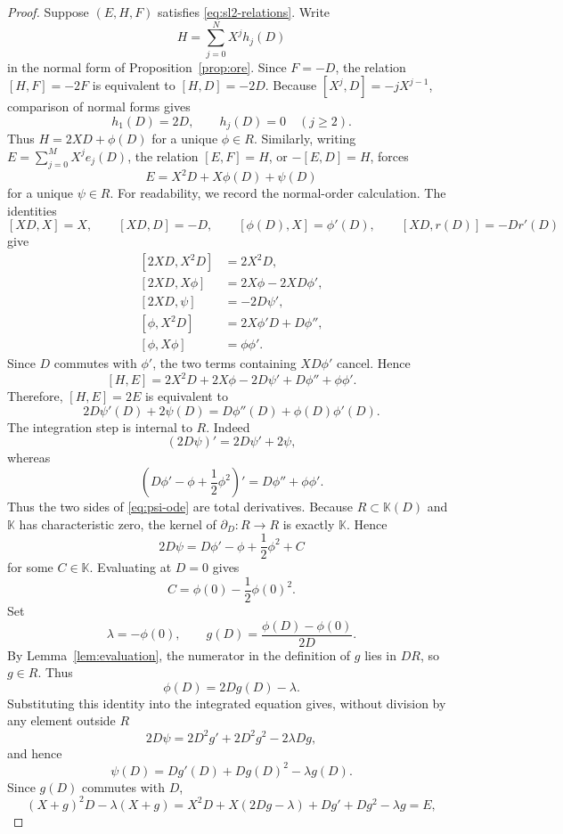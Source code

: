 \documentclass[10pt,a4paper]{amsart}
\newcommand{\K}{\mathbb K}
\begin{document}
\begin{proof}
Suppose $(E,H,F)$ satisfies \eqref{eq:sl2-relations}.  Write
\[
 H=\sum_{j=0}^{N}X^j h_j(D)
\]
in the normal form of Proposition~\ref{prop:ore}.  Since $F=-D$, the relation $[H,F]=-2F$ is equivalent to $[H,D]=-2D$.  Because $[X^j,D]=-jX^{j-1}$, comparison of normal forms gives
\[
 h_1(D)=2D,
 \qquad
 h_j(D)=0\quad(j\ge2).
\]
Thus $H=2XD+\phi(D)$ for a unique $\phi\in R$. Similarly, writing $E=\sum_{j=0}^{M}X^j e_j(D)$, the relation $[E,F]=H$, or $-[E,D]=H$, forces
\[
 E=X^2D+X\phi(D)+\psi(D)
\]
for a unique $\psi\in R$.  For readability, we record the normal-order calculation.  The identities
\[
 [XD,X]=X,
 \qquad
 [XD,D]=-D,
 \qquad
 [\phi(D),X]=\phi'(D),
 \qquad
 [XD,r(D)]=-Dr'(D)
\]
give
\[
\begin{aligned}
 [2XD,X^2D]&=2X^2D,\\
 [2XD,X\phi]&=2X\phi-2XD\phi',\\
 [2XD,\psi]&=-2D\psi',\\
 [\phi,X^2D]&=2X\phi'D+D\phi'',\\
 [\phi,X\phi]&=\phi\phi'.
\end{aligned}
\]
Since $D$ commutes with $\phi'$, the two terms containing $X D\phi'$ cancel.  Hence
\[
 [H,E]=2X^2D+2X\phi-2D\psi'+D\phi''+\phi\phi'.
\]
Therefore, $[H,E]=2E$ is equivalent to
\begin{equation}\label{eq:psi-ode}
 2D\psi'(D)+2\psi(D)=D\phi''(D)+\phi(D)\phi'(D).
\end{equation}
The integration step is internal to $R$.  Indeed
\[
 (2D\psi)'=2D\psi'+2\psi,
\]
whereas
\[
 \left(D\phi'-\phi+\frac12\phi^2\right)'
 =D\phi''+\phi\phi'.
\]
Thus the two sides of \eqref{eq:psi-ode} are total derivatives.  Because $R\subset\K(D)$ and $\K$ has characteristic zero, the kernel of $\partial_D:R\to R$ is exactly $\K$.  Hence
\[
 2D\psi=D\phi'-\phi+\frac12\phi^2+C
\]
for some $C\in\K$.  Evaluating at $D=0$ gives
\[
 C=\phi(0)-\frac12\phi(0)^2.
\]
Set
\begin{equation}\label{eq:recover-lambda-g}
 \lambda=-\phi(0),
 \qquad
 g(D)=\frac{\phi(D)-\phi(0)}{2D}.
\end{equation}
By Lemma~\ref{lem:evaluation}, the numerator in the definition of $g$ lies in $DR$, so $g\in R$.  Thus
\[
 \phi(D)=2Dg(D)-\lambda.
\]
Substituting this identity into the integrated equation gives, without division by any element outside $R$
\[
 2D\psi=2D^2g'+2D^2g^2-2\lambda Dg,
\]
and hence
\[
 \psi(D)=Dg'(D)+Dg(D)^2-\lambda g(D).
\]
Since $g(D)$ commutes with $D$,
\[
 (X+g)^2D-\lambda(X+g)
 =X^2D+X(2Dg-\lambda)+Dg'+Dg^2-\lambda g=E,
\]
\end{proof}
\end{document}
